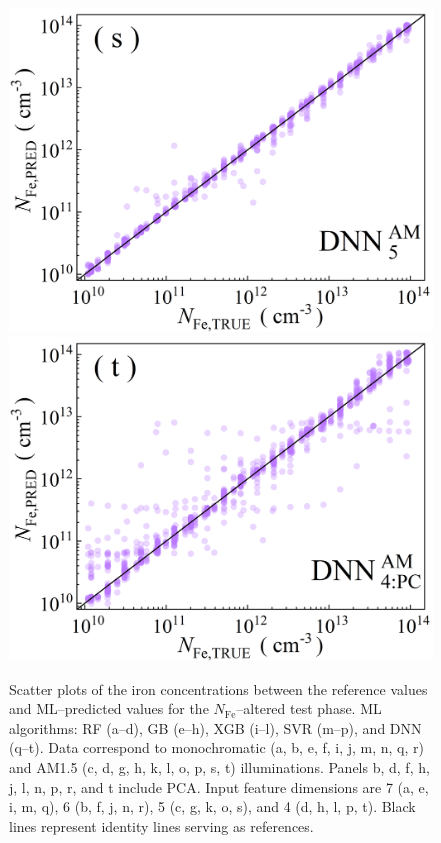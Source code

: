 \documentclass[a4paper,fleqn]{cas-sc}
\begin{document}
\begin{figure}
     \includegraphics[width=0.2\linewidth]{Fig6s.png}
     \includegraphics[width=0.2\linewidth]{Fig6t.png}
	  \caption{Scatter plots of the iron concentrations between the reference values and ML--predicted values for the $N_\mathrm{Fe}$--altered test phase. ML algorithms: RF (a--d), GB (e--h), XGB (i--l), SVR (m--p), and DNN (q--t). Data correspond to monochromatic (a, b, e, f, i, j, m, n, q, r) and AM1.5 (c, d, g, h, k, l, o, p, s, t) illuminations. Panels b, d, f, h, j, l, n, p, r, and t include PCA. Input feature dimensions are 7 (a, e, i, m, q), 6 (b, f, j, n, r), 5 (c, g, k, o, s), and 4 (d, h, l, p, t). Black lines represent identity lines serving as references.
}\label{fig6}
\end{figure}
\end{document}
